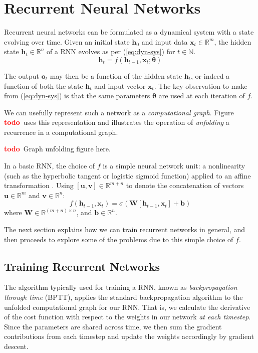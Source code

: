 \documentclass[12pt,a4paper,twoside,openright]{report}
\newcommand{\vect}[1]{\boldsymbol{\mathbf{#1}}}
\newcommand{\todo}{\textcolor{red}{\textbf{todo}~}}
\begin{document}
\section{Recurrent Neural Networks}\label{sec:rnn-intro}

Recurrent neural networks can be formulated as a dynamical system with a state
evolving over time. Given an initial state $\vect{h}_0$ and input data
$\vect{x}_t \in \mathbb{R}^m$, the hidden state $\vect{h}_t \in \mathbb{R}^n$ of
a RNN evolves as per (\ref{eq:dyn-sys}) for $t \in \mathbb{N}$.
\begin{equation}
  \vect{h}_t = f(\vect{h}_{t-1}, \vect{x}_t; \vect{\theta})
  \label{eq:dyn-sys}
\end{equation} 

The output
$\vect{o}_t$ may then be a function of the hidden state $\vect{h}_t$, or indeed
a function of both the state $\vect{h}_t$ and input vector $\vect{x}_t$. The key
observation to make from (\ref{eq:dyn-sys}) is that the same parameters
$\vect{\theta}$ are used at each iteration of $f$. 

We can usefully represent such a network as a \emph{computational graph}. Figure
\todo uses this representation and illustrates the operation of
\emph{unfolding} a recurrence in a computational graph.

\todo Graph unfolding figure here.

In a basic RNN, the choice of $f$ is a simple neural network unit: a
nonlinearity (such as the hyperbolic tangent or logistic sigmoid function)
applied to an affine transformation \cite{zaremba2014recurrent}. Using
$[\vect{u},\vect{v}] \in \mathbb{R}^{m+n}$ to denote the concatenation of
vectors $\vect{u} \in \mathbb{R}^m$ and $\vect{v} \in \mathbb{R}^n$: 
$$f(\vect{h}_{t-1}, \vect{x}_t) = \sigma(\vect{W}[\vect{h}_{t-1}, 
\vect{x}_t] + \vect{b})$$ 
where $\vect{W} \in \mathbb{R}^{(m+n) \times n}$, and $\vect{b} \in
\mathbb{R}^n$. 

The next section explains how we can train recurrent networks in general, and
then proceeds to explore some of the problems due to this simple choice of $f$.

\subsection{Training Recurrent Networks}\label{sec:rnn-train}

The algorithm typically used for training a RNN, known as \emph{backpropagation
through time} (BPTT), applies the standard backpropagation algorithm to the
unfolded computational graph for our RNN. That is, we calculate the derivative
of the cost function with respect to the weights in our network \emph{at each
timestep}. Since the parameters are shared across time, we then sum the gradient
contributions from each timestep and update the weights accordingly by gradient
descent.
\end{document}
